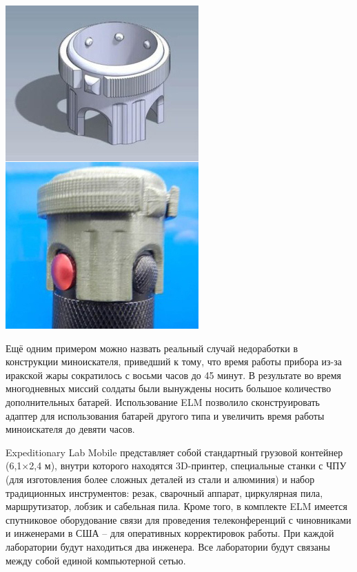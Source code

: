 \documentclass{magazine}
\begin{document}
{\begin{multicols}{2}
\noindent\includegraphics[height=0.5\textheight]{fig/00/03.jpg}

Ещё одним примером можно назвать реальный случай недоработки в
конструкции миноискателя, приведший к тому, что время работы прибора из-за
иракской жары сократилось с восьми часов до 45 минут. В результате во время
многодневных миссий солдаты были вынуждены носить большое количество
дополнительных батарей. Использование ELM позволило сконструировать адаптер для
использования батарей другого типа и увеличить время работы миноискателя до
девяти часов.

Expeditionary Lab Mobile представляет собой стандартный грузовой контейнер
(6,1$\times$2,4 м), внутри которого находятся 3D-принтер, специальные станки с
ЧПУ (для изготовления более сложных деталей из стали и алюминия) и набор
традиционных инструментов: резак, сварочный аппарат, циркулярная пила,
маршрутизатор, лобзик и сабельная пила. Кроме того, в комплекте ELM имеется
спутниковое оборудование связи для проведения телеконференций с чиновниками и
инженерами в США – для оперативных корректировок работы. При каждой лаборатории
будут находиться два инженера. Все лаборатории будут связаны между собой единой
компьютерной сетью.


\end{multicols}}
\end{document}
